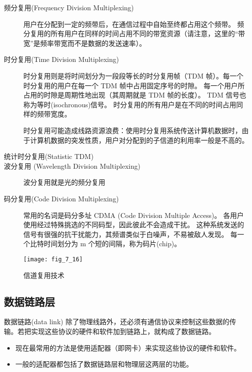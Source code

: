 \begin{description}
  \item[频分复用(Frequency Division Multiplexing) ]用户在分配到一定的频带后，在通信过程中自始至终都占用这个频带。
频分复用的所有用户在同样的时间占用不同的带宽资源（请注意，这里的“带宽”是频率带宽而不是数据的发送速率）。

  \item[时分复用(Time Division Multiplexing)]时分复用则是将时间划分为一段段等长的时分复用帧（TDM 帧）。每一个时分复用的用户在每一个 TDM 帧中占用固定序号的时隙。
每一个用户所占用的时隙是周期性地出现（其周期就是 TDM  帧的长度）。
TDM 信号也称为等时(isochronous)信号。
时分复用的所有用户是在不同的时间占用同样的频带宽度。

时分复用可能造成线路资源浪费：使用时分复用系统传送计算机数据时，由于计算机数据的突发性质，用户对分配到的子信道的利用率一般是不高的。
  \item[统计时分复用(Statistic TDM)]
  \item[波分复用 (Wavelength Division Multiplexing)] 波分复用就是光的频分复用
  \item[码分复用(Code Division Multiplexing) ]常用的名词是码分多址 CDMA
    (Code Division Multiple Access)。
各用户使用经过特殊挑选的不同码型，因此彼此不会造成干扰。
这种系统发送的信号有很强的抗干扰能力，其频谱类似于白噪声，不易被敌人发现。
每一个比特时间划分为 m 个短的间隔，称为码片(chip)。
\end{description}



\begin{figure}
  \centering
  \texttt{[image: fig\_7\_16]}\\
  \caption{信道复用技术 }\label{fig_7_16}
\end{figure}









\subsection{数据链路层}

数据链路(data link) 除了物理线路外，还必须有通信协议来控制这些数据的传输。若把实现这些协议的硬件和软件加到链路上，就构成了数据链路。
      \begin{itemize}
        \item 现在最常用的方法是使用适配器（即网卡）来实现这些协议的硬件和软件。

        \item 一般的适配器都包括了数据链路层和物理层这两层的功能。

      \end{itemize}


